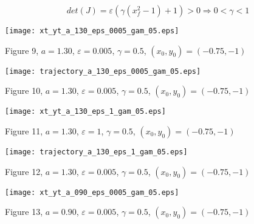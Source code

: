 \documentclass{article}
\begin{document}
\begin{equation*}
det(J)=\varepsilon(\gamma (x_f^2-1)+1)>0 \Longrightarrow 0<\gamma<1 
 \end{equation*}

\begin{center}
\texttt{[image: xt\_yt\_a\_130\_eps\_0005\_gam\_05.eps]}
\begin{footnotesize}
 Figure 9, $a=1.30$, $\varepsilon=0.005$, $\gamma=0.5$,  $(x_0,y_0)=(-0.75,-1)$ 
\end{footnotesize}
\end{center}

\begin{center}
\texttt{[image: trajectory\_a\_130\_eps\_0005\_gam\_05.eps]}
\begin{footnotesize}
 Figure 10,  $a=1.30$, $\varepsilon=0.005$,                   $\gamma=0.5$, $(x_0,y_0)=(-0.75,-1)$  
\end{footnotesize}
\end{center}

\begin{center}
\texttt{[image: xt\_yt\_a\_130\_eps\_1\_gam\_05.eps]}
\begin{footnotesize}
 Figure 11, $a=1.30$, $\varepsilon=1$, $\gamma=0.5$,  $(x_0,y_0)=(-0.75,-1)$ 
\end{footnotesize}
\end{center}

\begin{center}
\texttt{[image: trajectory\_a\_130\_eps\_1\_gam\_05.eps]}
\begin{footnotesize}
 Figure 12,  $a=1.30$, $\varepsilon=0.005$,                   $\gamma=0.5$, $(x_0,y_0)=(-0.75,-1)$  
\end{footnotesize}
\end{center}

\begin{center}
\texttt{[image: xt\_yt\_a\_090\_eps\_0005\_gam\_05.eps]}
\begin{footnotesize}
 Figure 13, $a=0.90$, $\varepsilon=0.005$, $\gamma=0.5$,  $(x_0,y_0)=(-0.75,-1)$ 
\end{footnotesize}
\end{center}
\end{document}
